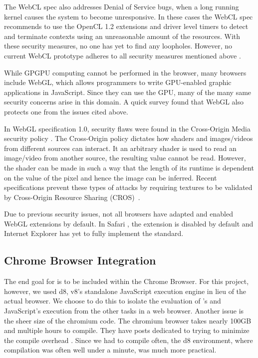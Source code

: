 The WebCL spec also addresses Denial of Service bugs, when a long running kernel
causes the system to become unresponsive. In these cases the WebCL spec
recommends to use the OpenCL 1.2 extensions and driver level timers to detect
and terminate contexts using an unreasonable amount of the resources.
With these security measures, no one has yet to find any loopholes. However, no
current WebCL prototype adheres to all security measures mentioned above
\cite{nokiasecurity}.

While GPGPU computing cannot be performed in the browser, many browsers include
WebGL, which allows programmers to write GPU-enabled graphic applications in
JavaScript. Since they can use the GPU, many of the many same security concerns
arise in this domain. A quick survey found that WebGL also protects one from the
issues cited above.

In WebGL specification 1.0, security flaws were found in the Cross-Origin
Media security policy \cite{webGLerror1, webGLerror2}. The Cross-Origin policy
dictates how shaders and images/videos from different sources can interact. It
an arbitrary shader is used to read an image/video from another source, the
resulting value cannot be read. However, the shader can be made in such a way
that the length of its runtime is dependent on the value of the pixel and hence
the image can be inferred. Recent specifications prevent these types of attacks
by requiring textures to be validated by Cross-Origin Resource Sharing
(CROS)~\cite{cros}.

Due to previous security issues, not all browsers have adapted and enabled WebGL
extensions by default. In Safari \cite{safari}, the extension is disabled by
default and Internet Explorer \cite{IE} has yet to fully implement the standard.

\subsection{Chrome Browser Integration} The end goal for \name is to be included within the
Chrome Browser. For this project, however, we used d8, v8's standalone
JavaScript execution engine in lieu of the actual browser. We choose to do this
to isolate the evaluation of \namens's and JavaScript's execution from the other
tasks in a web browser.  Another issue is the sheer size of the chromium code.
The chromium browser takes nearly 100GB and multiple hours to compile. They have
posts dedicated to trying to minimize the compile overhead
\cite{linuxfasterbuilds}.  Since we had to compile often, the d8 environment,
where compilation was often well under a minute, was much more practical.

